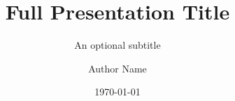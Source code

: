 
\title[Short title]{Full Presentation Title}
\subtitle{An optional subtitle}

\author[A. Author]{Author Name}


\date{\today}

%
%
